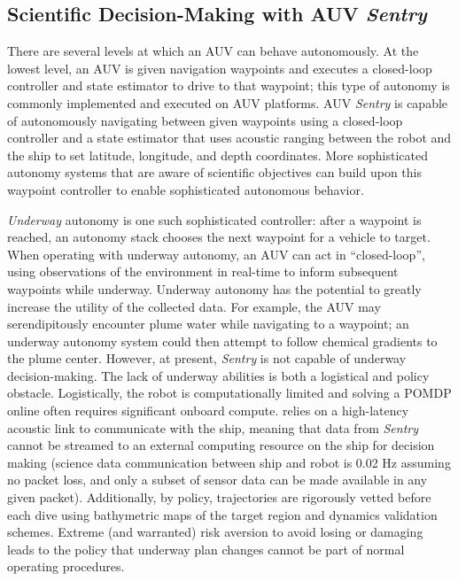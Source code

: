\subsection{Scientific Decision-Making with AUV \emph{Sentry}}
There are several levels at which an AUV can behave autonomously. At the lowest level, an AUV is given navigation waypoints and executes a closed-loop controller and state estimator to drive to that waypoint; this type of autonomy is commonly implemented and executed on AUV platforms. AUV \emph{Sentry} is capable of autonomously navigating between given waypoints using a closed-loop controller and a state estimator that uses acoustic ranging between the robot and the ship to set latitude, longitude, and depth coordinates. More sophisticated autonomy systems that are aware of scientific objectives can build upon this waypoint controller to enable sophisticated autonomous behavior. 

\textit{Underway} autonomy is one such sophisticated controller: after a waypoint is reached, an autonomy stack chooses the next waypoint for a vehicle to target. When operating with underway autonomy, an AUV can act in ``closed-loop'', using observations of the environment in real-time to inform subsequent waypoints while underway. Underway autonomy has the potential to greatly increase the utility of the collected data. For example, the AUV may serendipitously encounter plume water while navigating to a waypoint; an underway autonomy system could then attempt to follow chemical gradients to the plume center. However, at present, \emph{Sentry} is not capable of underway decision-making. The lack of underway abilities is both a logistical and policy obstacle. Logistically, the robot is computationally limited and solving a POMDP online often requires significant onboard compute. \Sentry relies on a high-latency acoustic link to communicate with the ship, meaning that data from \emph{Sentry} cannot be streamed to an external computing resource on the ship for decision making (science data communication between ship and robot is 0.02 Hz assuming no packet loss, and only a subset of sensor data can be made available in any given packet). Additionally, by policy, \Sentry trajectories are rigorously vetted before each dive using bathymetric maps of the target region and dynamics validation schemes. Extreme (and warranted) risk aversion to avoid losing or damaging \Sentry leads to the policy that underway plan changes cannot be part of normal operating procedures.


